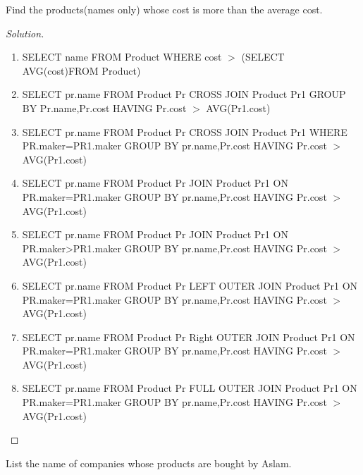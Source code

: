 \documentclass[10pt,a4paper]{article}
\newenvironment{problem}[2][Problem]{\begin{trivlist}
\item[\hskip \labelsep {\bfseries #1}\hskip \labelsep {\bfseries #2.}]}{\end{trivlist}}
\begin{document}
\begin{problem}{1}
Find the products(names only) whose cost is more than the average cost.
\end{problem}
\begin{proof}[Solution] 

\begin{enumerate}
    \item SELECT name FROM Product WHERE cost $>$ (SELECT AVG(cost)FROM Product)
    \item SELECT pr.name FROM Product Pr CROSS JOIN Product Pr1 GROUP BY Pr.name,Pr.cost HAVING Pr.cost $>$ AVG(Pr1.cost)
    \item SELECT pr.name FROM Product Pr CROSS JOIN Product Pr1 WHERE PR.maker=PR1.maker GROUP BY pr.name,Pr.cost HAVING Pr.cost $>$ AVG(Pr1.cost)

	\item SELECT pr.name FROM Product Pr JOIN Product Pr1 ON PR.maker=PR1.maker GROUP BY pr.name,Pr.cost HAVING Pr.cost $>$ AVG(Pr1.cost)
	\item SELECT pr.name FROM Product Pr JOIN Product Pr1 ON PR.maker>PR1.maker GROUP BY pr.name,Pr.cost HAVING Pr.cost $>$ AVG(Pr1.cost)
	\item SELECT pr.name FROM Product Pr LEFT OUTER JOIN Product Pr1
ON PR.maker=PR1.maker GROUP BY pr.name,Pr.cost HAVING Pr.cost $>$ AVG(Pr1.cost)
	\item SELECT pr.name FROM Product Pr Right OUTER JOIN Product Pr1
ON PR.maker=PR1.maker GROUP BY pr.name,Pr.cost HAVING Pr.cost $>$ AVG(Pr1.cost)
	\item SELECT pr.name FROM Product Pr FULL OUTER JOIN Product Pr1
ON PR.maker=PR1.maker GROUP BY pr.name,Pr.cost HAVING Pr.cost $>$ AVG(Pr1.cost)

\end{enumerate}
\end{proof}

\begin{problem}{2}
List the name of companies whose products are bought by Aslam.
\end{problem}
\end{document}
